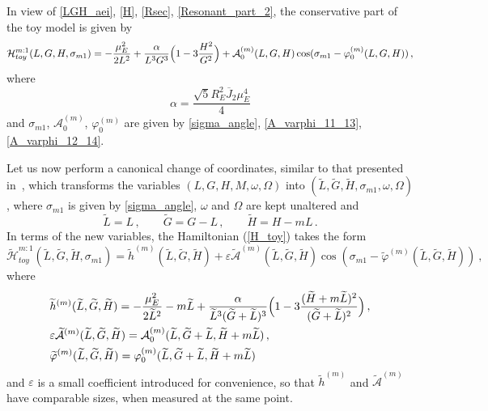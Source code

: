 \documentclass[12pt,reqno]{amsart}
\numberwithin{equation}{section}
\newcommand\equ[1]{{\rm (\ref{#1})}}
\begin{document}
In view of \eqref{LGH_aei}, \eqref{H}, \eqref{Rsec}, \eqref{Resonant_part_2},  the conservative part of
the toy model is given by
\begin{equation}\label{H_toy}
\mathcal{H}^{m:1}_{toy}(L,G,H,\sigma_{m1})=-\frac{\mu_E^2}{2 L^2}+\frac{\alpha}{L^3 G^3} \Bigl(1-3 \frac{H^2}{G^2}\Bigr)
+\mathcal{A}_0^{(m)} (L,G,H) \cos (\sigma_{m1}-\varphi_0^{(m)} (L,G,H))\,,
\end{equation}
where
$$
\alpha=\frac{\sqrt{5}R_E^2 \overline{J}_2 \mu_E^4}{4}
$$
and $\sigma_{m1}$, $\mathcal{A}_0^{(m)}$, $\varphi_0^{(m)}$ are given by
\eqref{sigma_angle}, \eqref{A_varphi_11_13}, \eqref{A_varphi_12_14}.

Let us now perform a canonical change of coordinates, similar to that presented in~\cite{CGmajor}, which transforms the variables $(L,G,H, M, \omega, \Omega)$ into $(\widetilde{L}, \widetilde{G}, \widetilde{H}, \sigma_{m1}, \omega, \Omega)$, where $\sigma_{m1}$
is given by \eqref{sigma_angle}, $\omega$ and $\Omega$ are kept unaltered and
\begin{equation}\label{canonical_transformation}
\widetilde{L}=L\,, \qquad \widetilde{G}=G-L\,, \qquad \widetilde{H}=H-m L\,.
\end{equation}
In terms of the new variables, the Hamiltonian \equ{H_toy} takes the form
\begin{equation}\label{toy_ham_canonical}
\widetilde{\mathcal{H}}^{m:1}_{toy}(\widetilde L,\widetilde G,\widetilde H,\sigma_{m1})=
\widetilde{h}^{(m)}(\widetilde L,\widetilde G,\widetilde H)
+\varepsilon \widetilde{\mathcal{A}}^{(m)}(\widetilde L,\widetilde G,\widetilde H)
\cos (\sigma_{m1}-\widetilde{\varphi}^{(m)}(\widetilde L,\widetilde G,\widetilde H))\ ,
\end{equation}
where
\begin{equation}\label{hAphi_tilde}
\begin{split}
&\widetilde{h}^{(m)}(\widetilde{L}, \widetilde{G}, \widetilde{H})=-\frac{\mu_E^2}{2 \widetilde{L}^2}-m \widetilde{L}+\frac{\alpha}{\widetilde{L}^3 (\widetilde{G}+\widetilde{L})^3} \Bigl(1-3 \frac{(\widetilde{H}+m \widetilde{L})^2}{(\widetilde{G}+ \widetilde{L})^2}\Bigr)\,,\\
&\varepsilon \widetilde{\mathcal{A}}^{(m)}(\widetilde{L}, \widetilde{G}, \widetilde{H})=\mathcal{A}_0^{(m)}(\widetilde{L}, \widetilde{G}+\widetilde{L}, \widetilde{H}+m \widetilde{L})\,,\\
&\widetilde{\varphi}^{(m)}(\widetilde{L}, \widetilde{G}, \widetilde{H})=\varphi_0^{(m)}(\widetilde{L}, \widetilde{G}+\widetilde{L}, \widetilde{H}+m \widetilde{L})\,
\end{split}
\end{equation}
and $\varepsilon$ is a small coefficient introduced for convenience,
so that $\widetilde{h}^{(m)}$ and  $\widetilde{\mathcal{A}}^{(m)}$ have comparable
sizes, when measured at the same point.
\end{document}
